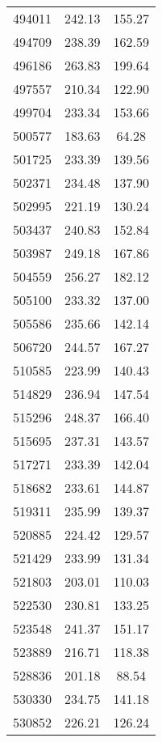 \documentclass[main.tex]{subfiles}
\begin{document}
\begin{longtable}{ccc}
		494011     & 242.13       & 155.27       \\
		494709     & 238.39       & 162.59       \\
		496186     & 263.83       & 199.64       \\
		497557     & 210.34       & 122.90       \\
		499704     & 233.34       & 153.66       \\
		500577     & 183.63       & 64.28        \\
		501725     & 233.39       & 139.56       \\
		502371     & 234.48       & 137.90       \\
		502995     & 221.19       & 130.24       \\
		503437     & 240.83       & 152.84       \\
		503987     & 249.18       & 167.86       \\
		504559     & 256.27       & 182.12       \\
		505100     & 233.32       & 137.00       \\
		505586     & 235.66       & 142.14       \\
		506720     & 244.57       & 167.27       \\
		510585     & 223.99       & 140.43       \\
		514829     & 236.94       & 147.54       \\
		515296     & 248.37       & 166.40       \\
		515695     & 237.31       & 143.57       \\
		517271     & 233.39       & 142.04       \\
		518682     & 233.61       & 144.87       \\
		519311     & 235.99       & 139.37       \\
		520885     & 224.42       & 129.57       \\
		521429     & 233.99       & 131.34       \\
		521803     & 203.01       & 110.03       \\
		522530     & 230.81       & 133.25       \\
		523548     & 241.37       & 151.17       \\
		523889     & 216.71       & 118.38       \\
		528836     & 201.18       & 88.54        \\
		530330     & 234.75       & 141.18       \\
		530852     & 226.21       & 126.24       \\

\end{longtable}
\end{document}
